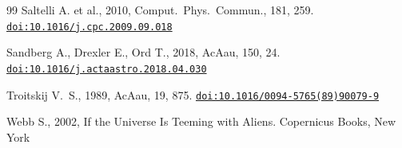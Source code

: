 \documentclass[useAMS,usenatbib,onecolumn]{mn2e}
\newcommand{\doi}[1]{\href{https://doi.org/#1}{\nolinkurl{doi:#1}}}
\begin{document}
\begin{thebibliography}{99}
Saltelli A. et al., 2010, Comput.~Phys.~Commun., 181, 259.
\newblock \doi{10.1016/j.cpc.2009.09.018}

Sandberg A., Drexler E., Ord T., 2018, AcAau, 150, 24.
\newblock \doi{10.1016/j.actaastro.2018.04.030}

Troitskij V.~S., 1989, AcAau, 19, 875.
\newblock \doi{10.1016/0094-5765(89)90079-9}

Webb S., 2002, If the Universe Is Teeming with Aliens. Copernicus Books, New York

\end{thebibliography}
\end{document}
